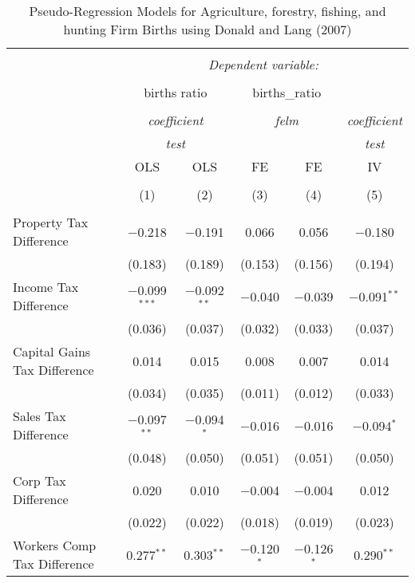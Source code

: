 
\begin{table}[!htbp] \centering 
  \caption{Pseudo-Regression Models for  Agriculture, forestry, fishing, and hunting Firm Births using Donald and Lang (2007)} 
  \label{} 
\begin{tabular}{@{\extracolsep{5pt}}lccccc} 
\\[-1.8ex]\hline 
\hline \\[-1.8ex] 
 & \multicolumn{5}{c}{\textit{Dependent variable:}} \\ 
\cline{2-6} 
\\[-1.8ex] & \multicolumn{2}{c}{births ratio} & \multicolumn{2}{c}{births\_ratio} &   \\ 
\\[-1.8ex] & \multicolumn{2}{c}{\textit{coefficient}} & \multicolumn{2}{c}{\textit{felm}} & \textit{coefficient} \\ 
 & \multicolumn{2}{c}{\textit{test}} & \multicolumn{2}{c}{\textit{}} & \textit{test} \\ 
 & OLS & OLS & FE & FE & IV \\ 
\\[-1.8ex] & (1) & (2) & (3) & (4) & (5)\\ 
\hline \\[-1.8ex] 
 Property Tax Difference & $-$0.218 & $-$0.191 & 0.066 & 0.056 & $-$0.180 \\ 
  & (0.183) & (0.189) & (0.153) & (0.156) & (0.194) \\ 
  Income Tax Difference & $-$0.099$^{***}$ & $-$0.092$^{**}$ & $-$0.040 & $-$0.039 & $-$0.091$^{**}$ \\ 
  & (0.036) & (0.037) & (0.032) & (0.033) & (0.037) \\ 
  Capital Gains Tax Difference & 0.014 & 0.015 & 0.008 & 0.007 & 0.014 \\ 
  & (0.034) & (0.035) & (0.011) & (0.012) & (0.033) \\ 
  Sales Tax Difference & $-$0.097$^{**}$ & $-$0.094$^{*}$ & $-$0.016 & $-$0.016 & $-$0.094$^{*}$ \\ 
  & (0.048) & (0.050) & (0.051) & (0.051) & (0.050) \\ 
  Corp Tax Difference & 0.020 & 0.010 & $-$0.004 & $-$0.004 & 0.012 \\ 
  & (0.022) & (0.022) & (0.018) & (0.019) & (0.023) \\ 
  Workers Comp Tax Difference & 0.277$^{**}$ & 0.303$^{**}$ & $-$0.120$^{*}$ & $-$0.126$^{*}$ & 0.290$^{**}$ \\ 

\end{tabular}
\end{table}
